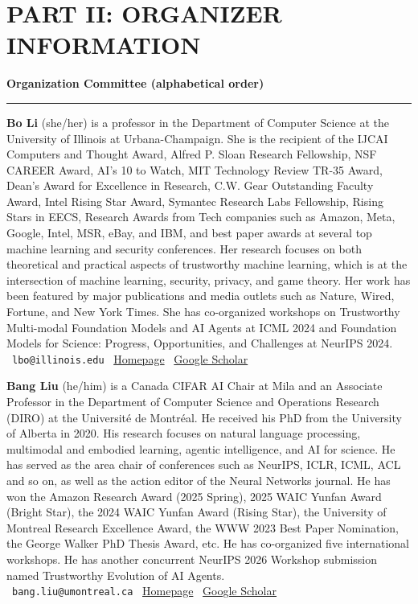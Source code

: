 \documentclass{article}
\newcommand{\orginfo}[3]{\\{\small\faEnvelope\ \texttt{#1} \hfill \faHome\ \href{https://#2}{Homepage} \hfill \faGraduationCap\ \href{https://scholar.google.com/citations?user=#3}{Google Scholar}}}
\newcommand{\sectiontitle}[1]{\noindent\textbf{\textcolor{neuripsblue}{#1}}\vspace{0.1cm}\hrule\vspace{0.2cm}}
\begin{document}
\section*{\textcolor{neuripsblue}{\large PART II: ORGANIZER INFORMATION}}
\vspace{-7pt}
\sectiontitle{Organization Committee (alphabetical order)}
\vspace{-2pt}
\textbf{Bo Li} (she/her) is a professor in the Department of Computer Science at the University of Illinois at Urbana-Champaign. She is the recipient of the IJCAI Computers and Thought Award, Alfred P. Sloan Research Fellowship, NSF CAREER Award, AI's 10 to Watch, MIT Technology Review TR-35 Award, Dean's Award for Excellence in Research, C.W. Gear Outstanding Faculty Award, Intel Rising Star Award, Symantec Research Labs Fellowship, Rising Stars in EECS, Research Awards from Tech companies such as Amazon, Meta, Google, Intel, MSR, eBay, and IBM, and best paper awards at several top machine learning and security conferences. Her research focuses on both theoretical and practical aspects of trustworthy machine learning, which is at the intersection of machine learning, security, privacy, and game theory. Her work has been featured by major publications and media outlets such as Nature, Wired, Fortune, and New York Times. She has co-organized workshops on Trustworthy Multi-modal Foundation Models and AI Agents at ICML 2024 and Foundation Models for Science: Progress, Opportunities, and Challenges at NeurIPS 2024.
\orginfo{lbo@illinois.edu}{aisecure.github.io}{K8vJkTcAAAAJ}

\textbf{Bang Liu} (he/him) 
is a Canada CIFAR AI Chair at Mila and an Associate Professor in the Department of Computer Science and Operations Research (DIRO) at the Université de Montréal. He received his PhD from the University of Alberta in 2020. His research focuses on natural language processing, multimodal and embodied learning, agentic intelligence, and AI for science. He has served as the area chair of conferences such as NeurIPS, ICLR, ICML, ACL and so on, as well as the action editor of the Neural Networks journal. He has won the Amazon Research Award (2025 Spring), 2025 WAIC Yunfan Award (Bright Star), the 2024 WAIC Yunfan Award (Rising Star), the University of Montreal Research Excellence Award, the WWW 2023 Best Paper Nomination, the George Walker PhD Thesis Award, etc. He has co-organized five international workshops. 
He has another concurrent NeurIPS 2026 Workshop submission named Trustworthy Evolution of AI Agents.
\orginfo{bang.liu@umontreal.ca}{https://www-labs.iro.umontreal.ca/~liubang/}{lmfAnP4AAAAJ}
\end{document}
